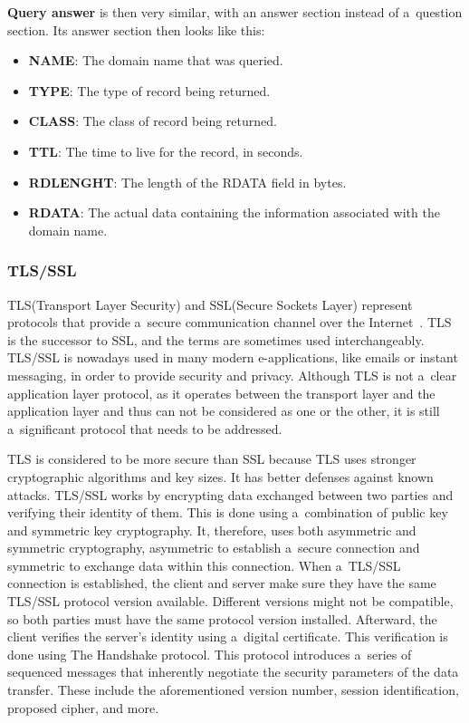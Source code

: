 \documentclass[
  printed,     %
  color,       %
  oneside,     %
  nosansbold,  %
  nocolorbold, %
  nolof,         %
  nolot,         %
]{fithesis4}
\begin{document}
\textbf{Query answer} is then very similar, with an answer section instead of a~question section. Its answer section then looks like this:

\begin{itemize}[noitemsep,topsep=0pt]
    \item \textbf{NAME}: The domain name that was queried.
    \item \textbf{TYPE}: The type of record being returned.
    \item \textbf{CLASS}: The class of record being returned.
    \item \textbf{TTL}: The time to live for the record, in seconds.
    \item \textbf{RDLENGHT}: The length of the RDATA field in bytes.
    \item \textbf{RDATA}: The actual data containing the information associated with the domain name.
\end{itemize}

\subsubsection{TLS/SSL}

TLS(Transport Layer Security) and SSL(Secure Sockets Layer) represent protocols that provide a~secure communication channel over the Internet~\cite{SSLTLSin60:online}. TLS is the successor to SSL, and the terms are sometimes used interchangeably. TLS/SSL is nowadays used in many modern e-applications, like emails or instant messaging, in order to provide security and privacy. Although TLS is not a~clear application layer protocol, as it operates between the transport layer and the application layer and thus can not be considered as one or the other, it is still a~significant protocol that needs to be addressed.

TLS is considered to be more secure than SSL because TLS uses stronger cryptographic algorithms and key sizes. It has better defenses against known attacks. TLS/SSL works by encrypting data exchanged between two parties and verifying their identity of them. This is done using a~combination of public key and symmetric key cryptography. It, therefore, uses both asymmetric and symmetric cryptography, asymmetric to establish a~secure connection and symmetric to exchange data within this connection. When a~TLS/SSL connection is established, the client and server make sure they have the same TLS/SSL protocol version available. Different versions might not be compatible, so both parties must have the same protocol version installed. Afterward, the client verifies the server's identity using a~digital certificate. This verification is done using The Handshake protocol. This protocol introduces a~series of sequenced messages that inherently negotiate the security parameters of the data transfer. These include the aforementioned version number, session identification, proposed cipher, and more.
\end{document}
